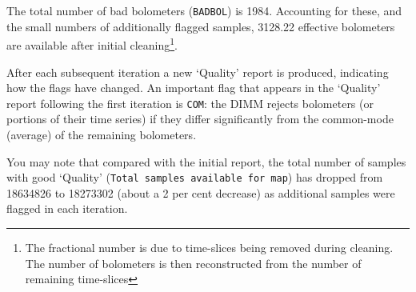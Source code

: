 \documentclass[twoside,11pt]{article}
\renewcommand{\_}{\texttt{\symbol{95}}}
\begin{document}
The total number of bad bolometers (\texttt{BADBOL}) is 1984.
Accounting for these, and the small numbers of additionally flagged
samples, 3128.22 effective bolometers are available after initial
cleaning\footnote{The fractional number is due to time-slices being
removed during cleaning. The number of bolometers is then
reconstructed from the number of remaining time-slices}.


After each subsequent iteration a new `Quality' report is produced,
indicating how the flags have changed. An important flag that appears
in the `Quality' report following the first iteration is \texttt{COM}:
the DIMM rejects bolometers (or portions of their time series) if they
differ significantly from the common-mode (average) of the remaining
bolometers.

You may note that compared with the initial report, the total number of samples
with good `Quality' (\texttt{Total samples available for map}) has
dropped from 18634826 to 18273302 (about a 2 per cent decrease) as
additional samples were flagged in each iteration.
\end{document}
